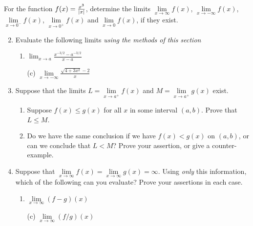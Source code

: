 \begin{exercises}
	\exstart For the function $f(x)=\frac{x^3}{\left| x\right|}$, determine the limits $\lim\limits_{x\to\infty}f(x)$, $\lim\limits_{x\to-\infty}f(x)$, $\lim\limits_{x\to 0^-}f(x)$, $\lim\limits_{x\to 0^+}f(x)$ and $\lim\limits_{x\to 0}f(x)$, if they exist.
	\begin{enumerate}\setcounter{enumi}{1}\itemsep0pt 
	  \item Evaluate the following limits \emph{using the methods of this section}
	  \begin{enumerate}
	    \item {}
	    \space$\displaystyle\lim_{x\to a}\frac{x^{-3/2}-a^{-3/2}}{x-a}$
	    \item[(c)] 
	    \space $\displaystyle\lim\limits_{x\to -\infty}\frac{\sqrt{4+3x^2}-2}{x}$
	  \end{enumerate}
	  
	  
	  \item Suppose that the limits $L=\lim\limits_{x\to a^+}f(x)$ and $M=\lim\limits_{x\to a^+}g(x)$ exist.
	  \begin{enumerate}
	    \item Suppose $f(x)\le g(x)$ for all $x$ in some interval $(a,b)$. Prove that $L\le M$.
	    \item Do we have the same conclusion if we have $f(x)<g(x)$ on $(a,b)$, or can we conclude that $L<M$? Prove your assertion, or give a counter-example.
	  \end{enumerate}
	  
	  
	  \item Suppose that $\lim\limits_{x\to\infty}f(x)=\lim\limits_{x\to\infty}g(x)=\infty$. Using \emph{only} this information, which of the following can you evaluate? Prove your assertions in each case.
	  \begin{enumerate}
	    \item {}\space\space $\lim\limits_{x\to\infty}(f-g)(x)$
	    \item[(c)] \space\space $\lim\limits_{x\to\infty}(f/g)(x)$
	  \end{enumerate}
	  

\end{enumerate}
\end{exercises}

